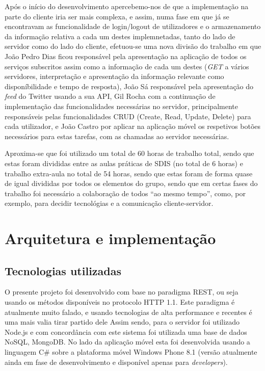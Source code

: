 \documentclass[12pt]{article}
\begin{document}
Após o início do desenvolvimento apercebemo-nos de que a implementação na parte do cliente iria ser mais complexa, e assim, numa fase em que já se encontravam as funcionalidade de login/logout de utilizadores e o armazenamento da informação relativa a cada um destes implemnetadas, tanto do lado de servidor como do lado do cliente, efetuou-se uma nova divisão do trabalho em que João Pedro Dias ficou responsável pela apresentação na aplicação de todos os serviços subscritos assim como a informação de cada um destes (\textit{GET} a vários servidores, interpretação e apresentação da informação relevante como disponíbilidade e tempo de resposta), João Sá responsável pela apresentação do \textit{feed} do Twitter usando a sua API, Gil Rocha com a continuação de implementação das funcionalidades necessárias no servidor, principalmente responsáveis pelas funcionalidades CRUD (Create, Read, Update, Delete) para cada utilizador, e João Castro por aplicar na aplicação móvel os respetivos botões necessários para estas tarefas, com as chamadas ao servidor necessárias.

Aproxima-se que foi utilizado um total de 60 horas de trabalho total, sendo que estas foram divididas entre as aulas práticas de SDIS (no total de 6 horas) e trabalho extra-aula no total de 54 horas, sendo que estas foram de forma quase de igual divididas por todos os elementos do grupo, sendo que em certas fases do trabalho foi necessário a colaboração de todos ``ao mesmo tempo'', como, por exemplo, para decidir tecnológias e a comunicação cliente-servidor. 

\section{Arquitetura e implementação}
\subsection{Tecnologias utilizadas}
	O presente projeto foi desenvolvido com base no paradigma REST, ou seja usando os métodos disponíveis no protocolo HTTP 1.1. Este paradigma é atualmente muito falado, e usando tecnologias de alta performance e recentes é uma mais valia tirar partido dele Assim sendo, para o servidor foi utilizado Node.js e com concordância com este sistema foi utilizada uma base de dados NoSQL, MongoDB. No lado da aplicação móvel esta foi desenvolvida usando a linguagem C\# sobre a plataforma móvel Windows Phone 8.1 (versão atualmente ainda em fase de desenvolvimento e disponível apenas para \textit{developers}).
	
\end{document}

